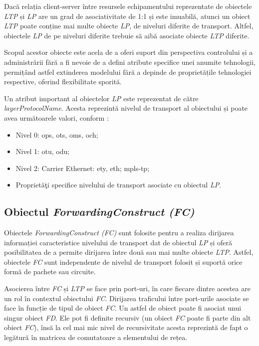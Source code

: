 Dacă relația client-server între resursele echipamentului reprezentate de obiectele \textit{LTP} și \textit{LP} are un grad de asociativitate de 1:1 și este imuabilă, atunci un obiect \textit{LTP} poate conține mai multe obiecte \textit{LP}, de niveluri diferite de transport. Altfel, obiectele \textit{LP} de pe niveluri diferite trebuie să aibă asociate obiecte \textit{LTP} diferite.

Scopul acestor obiecte este acela de a oferi suport din perspectiva controlului și a administrării fără a fi nevoie de a defini atribute specifice unei anumite tehnologii, permițând astfel extinderea modelului fără a depinde de proprietățile tehnologiei respective, oferind flexibilitate sporită.

Un atribut important al obiectelor \textit{LP} este reprezentat de către \textit{layerProtocolName}. Acesta reprezintă nivelul de transport al obiectului și poate avea următoarele valori, conform \cite{onftr512v1.2}:

\begin{itemize}
	\item Nivel 0: \gls{ops}, \gls{ots}, \gls{oms}, \gls{och};
	\item Nivel 1: \gls{otu}, \gls{odu};
	\item Nivel 2: Carrier Ethernet: \gls{ety}, \gls{eth}; \gls{mpls-tp};
	\item Proprietăţi specifice nivelului de transport asociate cu obiectul \textit{LP}.
\end{itemize}

\subsection{Obiectul \textit{ForwardingConstruct (FC)}}

Obiectele \textit{ForwardingConstruct (FC)} sunt folosite pentru a realiza dirijarea informației caracteristice nivelului de transport dat de obiectul \textit{LP} și oferă posibilitatea de a permite dirijarea între două sau mai multe obiecte \textit{LTP}. Astfel, obiectele \textit{FC} sunt independente de nivelul de transport folosit și suportă orice formă de pachete sau circuite.

Asocierea între \textit{FC} și \textit{LTP} se face prin port-uri, în care fiecare dintre acestea are un rol în contextul obiectului \textit{FC}. Dirijarea traficului între port-urile asociate se face în funcție de tipul de obiect \textit{FC}. Un astfel de obiect poate fi asociat unui singur obiect \textit{FD}. Ele pot fi definite recursiv (un obiect \textit{FC} poate fi parte din alt obiect \textit{FC}), însă la cel mai mic nivel de recursivitate acesta reprezintă de fapt o legătură în matricea de comutatoare a elementului de rețea.

